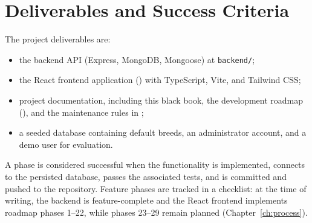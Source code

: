 \section{Deliverables and Success Criteria}

The project deliverables are:

\begin{itemize}
    \item the backend API (Express, MongoDB, Mongoose) at \texttt{backend/};
    \item the React frontend application () with TypeScript,
    Vite, and Tailwind CSS;
    \item project documentation, including this black book, the development
    roadmap (), and the
    maintenance rules in ;
    \item a seeded database containing default breeds, an administrator account,
    and a demo user for evaluation.
\end{itemize}

A phase is considered successful when the functionality is implemented, connects
to the persisted database, passes the associated tests, and is committed and
pushed to the repository. Feature phases are tracked in a checklist: at the time
of writing, the backend is feature-complete and the React frontend implements
roadmap phases 1--22, while phases 23--29 remain planned
(Chapter~\ref{ch:process}).
